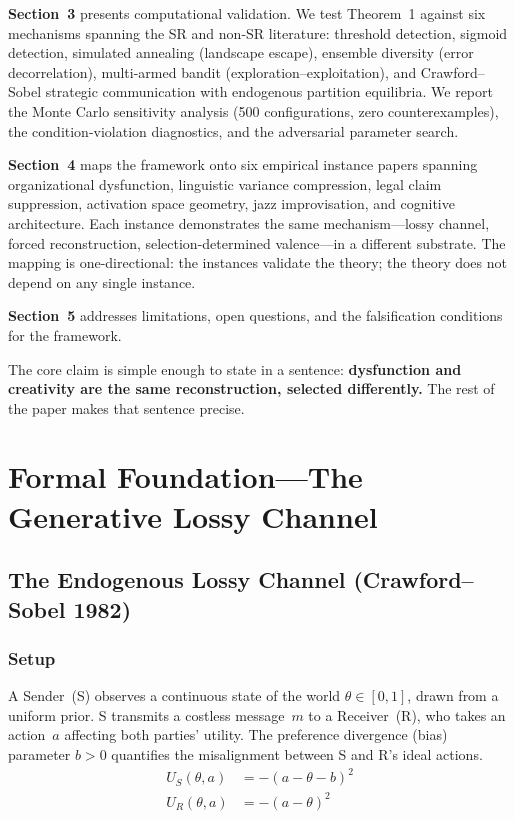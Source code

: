 \documentclass[12pt,letterpaper]{article}
\theoremstyle{definition}
\theoremstyle{remark}
\begin{document}
\textbf{Section~3} presents computational validation. We test Theorem~1 against six mechanisms spanning the SR and non-SR literature: threshold detection, sigmoid detection, simulated annealing (landscape escape), ensemble diversity (error decorrelation), multi-armed bandit (exploration--exploitation), and Crawford--Sobel strategic communication with endogenous partition equilibria. We report the Monte Carlo sensitivity analysis (500 configurations, zero counterexamples), the condition-violation diagnostics, and the adversarial parameter search.

\textbf{Section~4} maps the framework onto six empirical instance papers spanning organizational dysfunction, linguistic variance compression, legal claim suppression, activation space geometry, jazz improvisation, and cognitive architecture. Each instance demonstrates the same mechanism---lossy channel, forced reconstruction, selection-determined valence---in a different substrate. The mapping is one-directional: the instances validate the theory; the theory does not depend on any single instance.

\textbf{Section~5} addresses limitations, open questions, and the falsification conditions for the framework.

The core claim is simple enough to state in a sentence: \textbf{dysfunction and creativity are the same reconstruction, selected differently.} The rest of the paper makes that sentence precise.


\section{Formal Foundation---The Generative Lossy Channel}

\subsection{The Endogenous Lossy Channel (Crawford--Sobel 1982)}
\label{sec:crawfordsobel}

\subsubsection{Setup}

A Sender~(S) observes a continuous state of the world $\theta \in [0,1]$, drawn from a uniform prior. S transmits a costless message~$m$ to a Receiver~(R), who takes an action~$a$ affecting both parties' utility. The preference divergence (bias) parameter $b > 0$ quantifies the misalignment between S and R's ideal actions.
\begin{align}
U_S(\theta, a) &= -(a - \theta - b)^2 \\
U_R(\theta, a) &= -(a - \theta)^2
\end{align}
\end{document}
